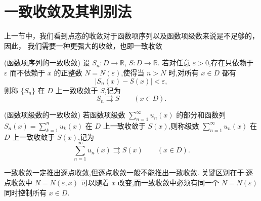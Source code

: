 \section{一致收敛及其判别法}
上一节中，我们看到点态的收敛对于函数项序列以及函数项级数来说是不足够的，因此， 我们需要一种更强大的收敛，也即一致收敛

\begin{definition}(函数项序列的一致收敛)
	设 $S_n:D\to\mathbb{R}$, $S:D\to\mathbb{R}$. 若对任意 $\varepsilon>0$,存在只依赖于 $\varepsilon$ 而不依赖于 $x$ 的正整数 $N=N(\varepsilon)$,使得当 $n>N$ 时,对所有 $x\in D$ 都有
	\[
	|S_n(x)-S(x)|<\varepsilon,
	\]
	则称 $\{S_n\}$ 在 $D$ 上一致收敛于 $S$,记为
	\[
	S_n\rightrightarrows S\qquad (x\in D).
	\]
\end{definition}

\begin{definition}(函数项级数的一致收敛)\label{函数项级数的一致收敛}
	若函数项级数 $\sum\limits_{n=1}^{\infty}u_n(x)$ 的部分和函数列 $S_n(x)=\sum\limits_{k=1}^{n}u_k(x)$ 在 $D$ 上一致收敛于 $S(x)$,则称级数 $\sum\limits_{n=1}^{\infty}u_n(x)$ 在 $D$ 上一致收敛于 $S(x)$,记为
	\[
	\sum_{n=1}^{\infty}u_n(x)\rightrightarrows S(x)\qquad (x\in D).
	\]
\end{definition}

一致收敛一定推出逐点收敛,但逐点收敛一般不能推出一致收敛. 关键区别在于:逐点收敛中 $N=N(\varepsilon,x)$ 可以随着 $x$ 改变,而一致收敛中必须有同一个 $N=N(\varepsilon)$ 同时控制所有 $x\in D$.

